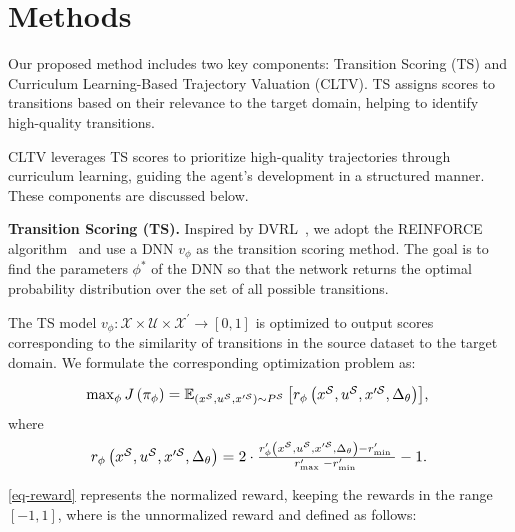 \section{Methods}
\label{sec:proposed_method}
Our proposed method includes two key components: Transition Scoring (TS) and Curriculum Learning-Based Trajectory Valuation (CLTV). TS assigns scores to transitions based on their relevance to the target domain, helping to identify high-quality transitions. 

CLTV leverages TS scores to prioritize high-quality trajectories through curriculum learning, guiding the agent's development in a structured manner. These components are discussed below.


\noindent\textbf{Transition Scoring (TS).}
Inspired by DVRL~\citep{yoon2020data}, we adopt the REINFORCE algorithm~\citep{williams1992simple} and use a DNN $v_{\phi}$ as the transition scoring method. The goal is to find the parameters $\phi^*$ of the DNN  so that the network returns the optimal probability distribution over the set of all possible transitions. 


The TS model $v_{\phi}: \mathcal{X} \times \mathcal{U} \times \mathcal{X^{\prime}} \rightarrow[0,1]$ is optimized to output scores corresponding to the similarity of transitions in the source dataset to the target domain. We formulate the corresponding optimization problem as:




\begin{equation}
\resizebox{0.72\hsize}{!}{%
$\max _\phi J\left(\pi_\phi\right)=\mathbb{E}_{\left(x^{\mathcal{S}}, u^{\mathcal{S}}, x^{\prime \mathcal{S}}\right) \sim P^{\mathcal{S}}}\left[r_\phi\left(x^{\mathcal{S}}, u^{\mathcal{S}}, x^{\prime \mathcal{S}}, \Delta_\theta\right)\right]$,
}
\end{equation}
where
\begin{equation}
\label{eq-reward}
\resizebox{0.72\hsize}{!}{
$r_\phi\left(x^{\mathcal{S}}, u^{\mathcal{S}}, x^{\prime \mathcal{S}}, \Delta_\theta\right)=2 \cdot \frac{r_\phi^{\prime}\left(x^{\mathcal{S}}, u^{\mathcal{S}}, x^{\prime \mathcal{S}}, \Delta_\theta\right)-r_{\text {min }}^{\prime}}{r_{\text {max }}^{\prime}-r_{\text {min }}^{\prime}}-1$.
}
\end{equation}


\autoref{eq-reward} represents the normalized reward, keeping the rewards in the range \([-1, 1]\), where  is the unnormalized reward and defined as follows:

